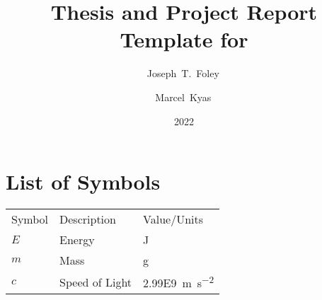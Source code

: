 \documentclass[showtrims]{rubook}
\title{Thesis and Project Report Template for \theInstitution{}}
\author{Joseph~T.~Foley\,\orcidlink{0000-0003-2515-1799} \and Marcel~Kyas\,\orcidlink{0000-0003-1018-3413}}
\date{2022}{5}{23}%
\begin{document}
\maketitle{}


\enableindents{}%

\clearpage{}
\tableofcontents{}\clearpage
\listoffigures{}\clearpage
\listoftables{}\clearpage

\chapter*{List of Symbols}%
\begin{tabular}{lll}
Symbol &Description &Value/Units\\
$E$ &Energy &\si{\joule}\\ %
$m$ &Mass &\si{\gram}\\ %
$c$ &Speed of Light &\SI{2.99E9}{\meter\per\square\second}\\ %
\end{tabular}
\end{document}
